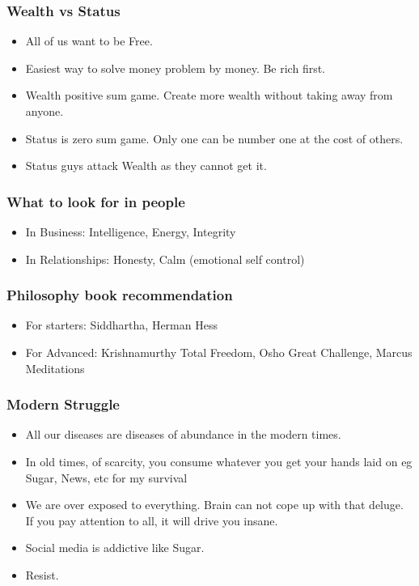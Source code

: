 \begin{frame}[fragile]\frametitle{Wealth vs Status}

\begin{itemize}
\item All of us want to be Free.
\item Easiest way to solve money problem by money. Be rich first.
\item Wealth positive sum game. Create more wealth without taking away from anyone.
\item Status is zero sum game. Only one can be number one at the cost of others.
\item Status guys attack Wealth as they cannot get it.
\end{itemize}

\end{frame}

\begin{frame}[fragile]\frametitle{What to look for in people}

\begin{itemize}
\item In Business: Intelligence, Energy, Integrity
\item In Relationships: Honesty, Calm (emotional self control)
\end{itemize}

\end{frame}

\begin{frame}[fragile]\frametitle{Philosophy book recommendation}

\begin{itemize}
\item For starters: Siddhartha, Herman Hess
\item For Advanced: Krishnamurthy Total Freedom, Osho Great Challenge, Marcus Meditations
\end{itemize}

\end{frame}

\begin{frame}[fragile]\frametitle{Modern Struggle}

\begin{itemize}
\item All our diseases are diseases of abundance in the modern times.
\item In old times, of scarcity, you consume whatever you get your hands laid on eg Sugar, News, etc for my survival
\item We are over exposed to everything. Brain can not cope up with that deluge. If you pay attention to all, it will drive you insane. 
\item Social media is addictive like Sugar.
\item Resist. 
\end{itemize}

\end{frame}

